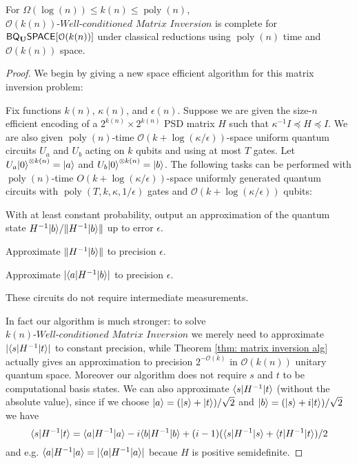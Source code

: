 \documentclass[a4paper,UKenglish]{lipics-v2016}
\newcommand\matrixinvert[1]{{\ensuremath{#1}}\textit{-Well-conditioned Matrix Inversion}}
\newcommand{\classfont}{\sf}
\newcommand{\Unitary}{\mathbf{U}}
\newcommand{\unitaryBQSPACE}[1]{{\classfont{BQ}_\Unitary\classfont{SPACE}}[#1]}
\newcommand\bigoh{\mathcal{O}}
\DeclareMathOperator{\poly}{poly}
\begin{document}
\begin{theorem} \label{thm: matrix invert}
For $\Omega(\log(n)) \le k(n) \le \poly(n)$, $\matrixinvert{\mathcal{O}(k(n))}$ is complete for $\unitaryBQSPACE{\mathcal{O}(k(n))}$ under classical reductions using $\poly(n)$ time and $\mathcal{O}(k(n))$ space.
\end{theorem}
\begin{proof}
We begin by giving a new space efficient algorithm for this matrix inversion problem:

\begin{theorem} \label{thm: matrix inversion alg}
Fix functions $k(n)$, $\kappa(n)$, and $\epsilon(n)$. Suppose we are given the size-$n$ efficient encoding of a $2^{k(n)} \times 2^{k(n)}$ PSD matrix $H$ such that $\kappa^{-1} I \preceq H \preceq I$. We are also given $\poly(n)$-time $\mathcal{O}(k+\log(\kappa/\epsilon))$-space uniform quantum circuits $U_a$ and $U_b$ acting on $k$ qubits and using at most $T$ gates. Let $U_a{\left\vert{0}\right\rangle}^{\otimes k(n)} = {\left\vert{a}\right\rangle}$ and $U_b{\left\vert{0}\right\rangle}^{\otimes k(n)} = {\left\vert{b}\right\rangle}$. The following tasks can be performed with $\poly(n)$-time $O(k+\log(\kappa/\epsilon))$-space uniformly generated quantum circuits with $\poly(T,k,\kappa,1/\epsilon)$ gates and $\bigoh (k+\log(\kappa/\epsilon))$ qubits:
\begin{compactenum}
\item With at least constant probability, output an approximation of the quantum state $H^{-1}{\left\vert{b}\right\rangle} / \|H^{-1}{\left\vert{b}\right\rangle}\|$ up to error $\epsilon$.
\item Approximate $\|H^{-1}{\left\vert{b}\right\rangle}\|$ to precision $\epsilon$.
\item Approximate $|{\left\langle{a}\right\vert}H^{-1}{\left\vert{b}\right\rangle}|$ to precision $\epsilon$.
\end{compactenum}
These circuits do not require intermediate measurements.
\end{theorem}

In fact our algorithm is much stronger: to solve $\matrixinvert{k(n)}$ we merely need to approximate $|{\left\langle{s}\right\vert}H^{-1}{\left\vert{t}\right\rangle}|$ to constant precision, while Theorem \ref{thm: matrix inversion alg} actually gives an approximation to precision $2^{-\bigoh (k)}$ in $\bigoh (k(n))$ unitary quantum space. Moreover our algorithm does not require $s$ and $t$ to be computational basis states. We can also approximate ${\left\langle{s}\right\vert}H^{-1}{\left\vert{t}\right\rangle}$ (without the absolute value), since if we choose ${\left\vert{a}\right\rangle} = ({\left\vert{s}\right\rangle}+{\left\vert{t}\right\rangle})/\sqrt{2}$ and ${\left\vert{b}\right\rangle} = ({\left\vert{s}\right\rangle}+i{\left\vert{t}\right\rangle})/\sqrt{2}$ we have
\begin{equation}
{\left\langle{s}\right\vert}H^{-1}{\left\vert{t}\right\rangle} = {\left\langle{a}\right\vert} H^{-1} {\left\vert{a}\right\rangle} - i {\left\langle{b}\right\vert} H^{-1} {\left\vert{b}\right\rangle} + (i-1) ({\left\langle{s}\right\vert} H^{-1} {\left\vert{s}\right\rangle} + {\left\langle{t}\right\vert} H^{-1} {\left\vert{t}\right\rangle} ) / 2
\end{equation}
and e.g. ${\left\langle{a}\right\vert} H^{-1} {\left\vert{a}\right\rangle} = |{\left\langle{a}\right\vert} H^{-1} {\left\vert{a}\right\rangle}|$ becaue $H$ is positive semidefinite.


\end{proof}
\end{document}
